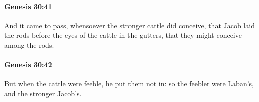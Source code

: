 		\paragraph{Genesis 30:41} %
			\label{GENESIS-30-41}

			And it came to pass, whensoever the stronger cattle did conceive, that Jacob laid the rods before the eyes of the cattle in the gutters, that they might conceive among the rods.


		\paragraph{Genesis 30:42} %
			\label{GENESIS-30-42}

			But when the cattle were feeble, he put them not in: so the feebler were Laban's, and the stronger Jacob's.


